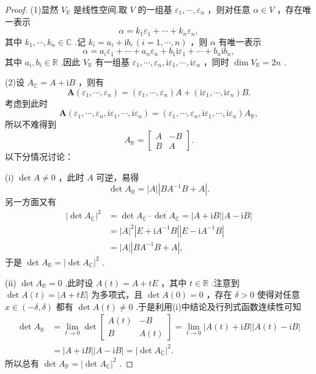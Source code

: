 \begin{proof}
	(1)显然 $V_{\mathbb{R}}$ 是线性空间.取 $V$ 的一组基 $\varepsilon_1,\cdots,\varepsilon_n$ ，则对任意 $\alpha\in V$ ，存在唯一表示
	\[
		\alpha=k_1\varepsilon_1+\cdots+k_n\varepsilon_n,
	\]
	其中 $k_1,\cdots,k_n\in\mathbb{C}$ .记 $k_i=a_i+\mathrm{i}b_i\,(i=1,\cdots,n)$ ，则 $\alpha$ 有唯一表示
	\[
		\alpha=a_i\varepsilon_1+\cdots+a_n\varepsilon_n+b_1\mathrm{i}\varepsilon_1+\cdots+b_n\mathrm{i}b_n,
	\]
	其中 $a_i,b_i\in\mathbb{R}$ .因此 $V_{\mathbb{R}}$ 有一组基 $\varepsilon_1,\cdots,\varepsilon_n,\mathrm{i}\varepsilon_1,\cdots,\mathrm{i}\varepsilon_n$ ，同时 $\dim V_{\mathbb{R}}=2n$ .

	(2)设 $A_{\mathbb{C}}=A+\mathrm{i}B$ ，则有
	\[
		\bm A(\varepsilon_1,\cdots,\varepsilon_n)=(\varepsilon_1,\cdots,\varepsilon_n)A+(\mathrm{i}\varepsilon_1,\cdots,\mathrm{i}\varepsilon_n)B.
	\]
	考虑到此时
	\[
		\bm A(\varepsilon_1,\cdots,\varepsilon_n,\mathrm{i}\varepsilon_1,\cdots,\mathrm{i}\varepsilon_n)=(\varepsilon_1,\cdots,\varepsilon_n,\mathrm{i}\varepsilon_1,\cdots,\mathrm{i}\varepsilon_n)A_{\mathbb{R}},
	\]
	所以不难得到
	\[
		A_{\mathbb{R}}=\begin{bmatrix}
			A & -B \\
			B & A
		\end{bmatrix}.
	\]
	以下分情况讨论：

	(i) $\det A\ne0$ ，此时 $A$ 可逆，易得
	\[
		\det A_{\mathbb{R}}=|A||BA^{-1}B+A|.
	\]
	另一方面又有
	\begin{align*}
		|\det A_{\mathbb{C}}|^2 & =\det A_{\mathbb{C}}\cdot\overline{\det A_{\mathbb{C}}}=|A+\mathrm{i}B||A-\mathrm{i}B| \\
		                        & =|A|^2|E+\mathrm{i}A^{-1}B||E-\mathrm{i}A^{-1}B|                                       \\
		                        & =|A||BA^{-1}B+A|,
	\end{align*}
	于是 $\det A_{\mathbb{R}}=|\det A_{\mathbb{C}}|^2$ .

	(ii) $\det A_{\mathbb{R}}=0$ .此时设 $A(t)=A+tE$ ，其中 $t\in\mathbb{R}$ .注意到 $\det A(t)=|A+tE|$ 为多项式，且 $\det A(0)=0$ ，存在 $\delta>0$ 使得对任意 $x\in(-\delta,\delta)$ 都有 $\det A(t)\ne0$ .于是利用(i)中结论及行列式函数连续性可知
	\begin{align*}
		\det A_{\mathbb{R}} & =\lim_{t\to0}\det\begin{bmatrix}
			A(t) & -B   \\
			B    & A(t)
		\end{bmatrix}=\lim_{t\to0}|A(t)+\mathrm{i}B||A(t)-\mathrm{i}B| \\
		                    & =|A+\mathrm{i}B||A-\mathrm{i}B|=|\det A_{\mathbb{C}}|^2.
	\end{align*}
	所以总有 $\det A_{\mathbb{R}}=|\det A_{\mathbb{C}}|^2$ .
\end{proof}
